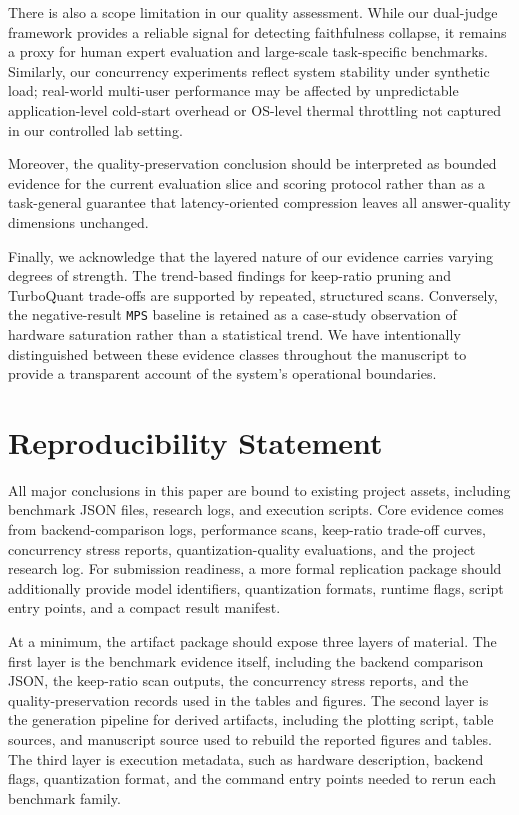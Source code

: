 \documentclass[10pt,twocolumn]{article}
\begin{document}
There is also a scope limitation in our quality assessment. While our dual-judge framework provides a reliable signal for detecting faithfulness collapse, it remains a proxy for human expert evaluation and large-scale task-specific benchmarks. Similarly, our concurrency experiments reflect system stability under synthetic load; real-world multi-user performance may be affected by unpredictable application-level cold-start overhead or OS-level thermal throttling not captured in our controlled lab setting.

Moreover, the quality-preservation conclusion should be interpreted as bounded evidence for the current evaluation slice and scoring protocol rather than as a task-general guarantee that latency-oriented compression leaves all answer-quality dimensions unchanged.

Finally, we acknowledge that the layered nature of our evidence carries varying degrees of strength. The trend-based findings for keep-ratio pruning and TurboQuant trade-offs are supported by repeated, structured scans. Conversely, the negative-result \texttt{MPS} baseline is retained as a case-study observation of hardware saturation rather than a statistical trend. We have intentionally distinguished between these evidence classes throughout the manuscript to provide a transparent account of the system's operational boundaries.

\section{Reproducibility Statement}

All major conclusions in this paper are bound to existing project assets, including benchmark JSON files, research logs, and execution scripts. Core evidence comes from backend-comparison logs, performance scans, keep-ratio trade-off curves, concurrency stress reports, quantization-quality evaluations, and the project research log. For submission readiness, a more formal replication package should additionally provide model identifiers, quantization formats, runtime flags, script entry points, and a compact result manifest.

At a minimum, the artifact package should expose three layers of material. The first layer is the benchmark evidence itself, including the backend comparison JSON, the keep-ratio scan outputs, the concurrency stress reports, and the quality-preservation records used in the tables and figures. The second layer is the generation pipeline for derived artifacts, including the plotting script, table sources, and manuscript source used to rebuild the reported figures and tables. The third layer is execution metadata, such as hardware description, backend flags, quantization format, and the command entry points needed to rerun each benchmark family.
\end{document}
